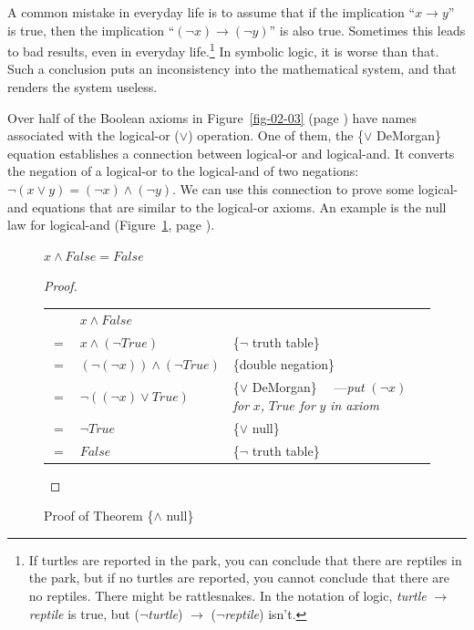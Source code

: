 A common mistake in everyday life is to assume that if the
implication ``$x \rightarrow y$'' is true, then the implication
``$(\neg x) \rightarrow (\neg y)$''
is also true. Sometimes this leads to bad
results, even in everyday life.\footnote{If turtles
are reported in the park,
you can conclude that there are reptiles in the park,
but if no turtles are reported, you cannot conclude
that there are no reptiles.
There might be rattlesnakes.
In the notation of logic,
\emph{turtle} $\rightarrow$ \emph{reptile} is true,
but ($\neg$\emph{turtle}) $\rightarrow$ ($\neg$\emph{reptile}) isn't.}
In symbolic logic,
it is worse than that. Such a conclusion puts an
inconsistency into the mathematical system, and that renders the system useless.

Over half of the Boolean axioms in Figure~\ref{fig-02-03} (page \pageref{fig-02-03})
have names associated with the logical-or ($\vee$) operation.
One of them, the
\{$\vee$ DeMorgan\} equation
establishes a connection between logical-or and logical-and.
It converts the negation of a logical-or to the logical-and of two negations:
$\neg(x \vee y) = (\neg x) \wedge (\neg y)$.
We can use this connection to prove some logical-and equations
that are similar to the logical-or axioms.
An example is the null law for logical-and
(Figure~\ref{fig:and-null-thm}, page \pageref{fig:and-null-thm}).

\begin{figure}
\begin{theorem}
$x \wedge False = False$
\end{theorem}

\begin{proof}
\mbox{} \\
\begin{tabular}{llp{3.15in}}
    & $x \wedge False$                       & \\
$=$ & $x \wedge (\neg True)$                 & \{$\neg$ truth table\} \\
$=$ & $(\neg (\neg x)) \wedge (\neg True)$   & \{double negation\} \\
$=$ & $\neg ((\neg x) \vee True)$            & \{$\vee$ DeMorgan\} ~~---\emph{put} $(\neg x)$ \emph{for} $x$\emph{,} $True$ \emph{for} $y$ \emph{in axiom}\\
$=$ & $\neg True$                            & \{$\vee$ null\} \\
$=$ & $False$                                & \{$\neg$ truth table\} \\
\end{tabular}

\end{proof}
\caption{Proof of Theorem \{$\wedge$ null\}}
\label{fig:and-null-thm}
\end{figure}

